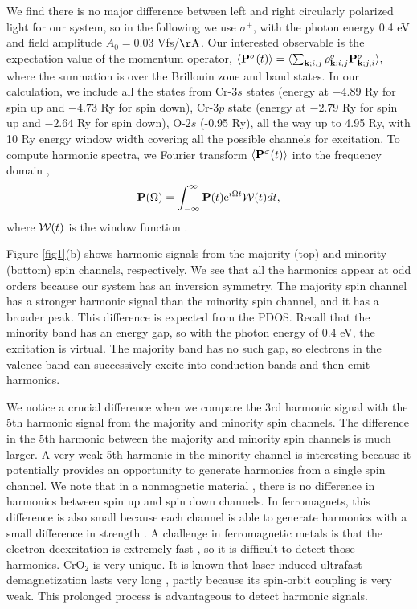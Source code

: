 \documentclass[checkin,showpacs,psfig,aps,pra]{revtex4}
\newcommand{\be}{\begin{equation}}
\newcommand{\ee}{\end{equation}}
\begin{document}
We find there is no major difference between left and right circularly
polarized light for our system, so in the following we use $\sigma^+$,
with the photon energy 0.4 eV and field amplitude $A_0=0.03$ Vfs/$\rm
\AA$. 
Our interested observable is the expectation value of the momentum
operator, $\langle {\bf P}^\sigma(t) \rangle =\langle \sum_{{\bf
    k};i,j} \rho_{{\bf k};i,j}^\sigma {\bf P}_{{\bf
    k};j,i}^\sigma\rangle, $ where the summation is over the Brillouin
zone and band states. In our calculation, we include all the states
from Cr-$3s$ states (energy at $-4.89$ Ry for spin up and $-4.73$ Ry
for spin down), Cr-$3p$ state (energy at $-2.79$ Ry for spin up and
$-2.64$ Ry for spin down), O-$2s$ (-0.95 Ry), all the way up to 4.95
Ry, with 10 Ry energy window width covering all the possible channels
for excitation. To compute harmonic spectra, we Fourier transform
$\langle {\bf P}^\sigma(t) \rangle$ into the frequency domain
\cite{nc18,prl05,jia2020a}, \be {\bf P}(\Omega)=\int_{-\infty}^{\infty} {\bf
  P}(t) {\rm e}^{i\Omega t} {\cal W}(t) dt, \ee where ${\cal W}(t)$ is
the window function \cite{nc18}. 


 Figure \ref{fig1}(b) shows harmonic signals from the majority (top)
 and minority (bottom) spin channels, respectively.  We see that all
 the harmonics appear at odd orders because our system has an
 inversion symmetry. The majority spin channel has a stronger harmonic
 signal than the minority spin channel, and it has a broader peak.
 This difference is expected from the PDOS. Recall that the minority
 band has an energy gap, so with the photon energy of 0.4 eV, the
 excitation is virtual.  The majority band has no such gap, so
 electrons in the valence band can successively excite into conduction
 bands and then emit harmonics. 

We notice a crucial difference when we compare the 3rd harmonic signal
with the 5th harmonic signal from the majority and minority spin
channels. The difference in the 5th harmonic between the majority and
minority spin channels is much larger.  A very weak 5th harmonic in
the minority channel is interesting because it potentially provides an
opportunity to generate harmonics from a single spin channel. We note
that in a nonmagnetic material \cite{jia2019}, there is no difference
in harmonics between spin up and spin down channels. In ferromagnets,
this difference is also small because each channel is able to generate
harmonics with a small difference in strength
\cite{nc18,jia2020a,jia2020b}.  A challenge in ferromagnetic metals is
that the electron deexcitation is extremely fast \cite{nc18}, so it is
difficult to detect those harmonics. CrO$_2$ is very unique. It is
known that laser-induced ultrafast demagnetization lasts very long
\cite{zhang2006}, partly because its spin-orbit coupling is very
weak. This prolonged process is advantageous to detect harmonic
signals.
\end{document}
